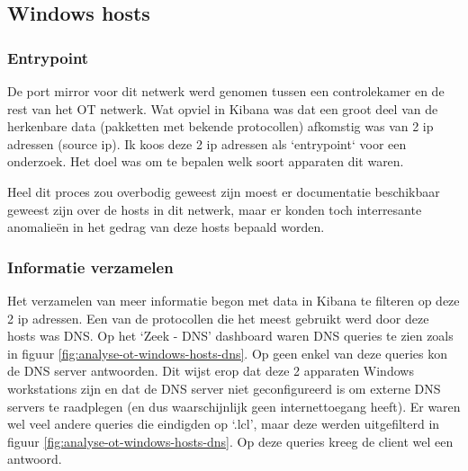 \documentclass[a4paper,12pt]{report}
\begin{document}
\subsection{Windows hosts}
\subsubsection{Entrypoint}
De port mirror voor dit netwerk werd genomen tussen een controlekamer en de rest van het OT netwerk.
Wat opviel in Kibana was dat een groot deel van de herkenbare data (pakketten met bekende protocollen) afkomstig was van 2 ip adressen (source ip).
Ik koos deze 2 ip adressen als `entrypoint` voor een onderzoek.
Het doel was om te bepalen welk soort apparaten dit waren.

Heel dit proces zou overbodig geweest zijn moest er documentatie beschikbaar geweest zijn over de hosts in dit netwerk, maar er konden toch interresante anomalieën in het gedrag van deze hosts bepaald worden.

\subsubsection{Informatie verzamelen}
Het verzamelen van meer informatie begon met data in Kibana te filteren op deze 2 ip adressen.
Een van de protocollen die het meest gebruikt werd door deze hosts was DNS.
Op het `Zeek - DNS' dashboard waren DNS queries te zien zoals in figuur \ref{fig:analyse-ot-windows-hosts-dns}.
Op geen enkel van deze queries kon de DNS server antwoorden.
Dit wijst erop dat deze 2 apparaten Windows workstations zijn en dat de DNS server niet geconfigureerd is om externe DNS servers te raadplegen (en dus waarschijnlijk geen internettoegang heeft).
Er waren wel veel andere queries die eindigden op `.lcl', maar deze werden uitgefilterd in figuur \ref{fig:analyse-ot-windows-hosts-dns}.
Op deze queries kreeg de client wel een antwoord.
\end{document}
